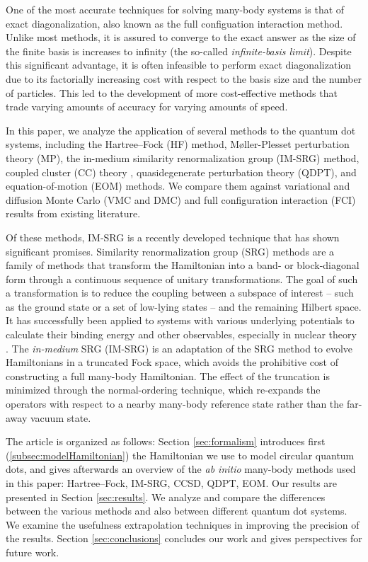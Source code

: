 One of the most accurate techniques for solving many-body systems is that of exact diagonalization, also known as the full configuation interaction method.  Unlike most methods, it is assured to converge to the exact answer as the size of the finite basis is increases to infinity (the so-called \textit{infinite-basis limit}).  Despite this significant advantage, it is often infeasible to perform exact diagonalization due to its factorially increasing cost with respect to the basis size and the number of particles.  This led to the development of more cost-effective methods that trade varying amounts of accuracy for varying amounts of speed.

In this paper, we analyze the application of several methods to the quantum dot systems, including the Hartree--Fock (HF) method, M\o ller-Plesset perturbation theory (MP), the in-medium similarity renormalization group (IM-SRG) method, coupled cluster (CC) theory \cite{PhysRevB.67.045320,heidari:114708,PhysRevB.84.115302}, quasidegenerate perturbation theory (QDPT), and equation-of-motion (EOM) methods.  We compare them against variational and diffusion Monte Carlo (VMC and DMC) \cite{PhysRevB.68.035304,PhysRevB.62.8120,PhysRevB.84.115302,PhysRevB.54.4780} and full configuration interaction (FCI) \cite{olsen2013thesis,JJAP.36.3924,PhysRevB.56.6428,2008arXiv0810.2644K,rontani:124102} results from existing literature.

Of these methods, IM-SRG is a recently developed technique that has shown significant promises.  Similarity renormalization group (SRG) methods are a family of methods that transform the Hamiltonian into a band- or block-diagonal form through a continuous sequence of unitary transformations.  The goal of such a transformation is to reduce the coupling between a subspace of interest -- such as the ground state or a set of low-lying states -- and the remaining Hilbert space.  It has successfully been applied to systems with various underlying potentials to calculate their binding energy and other observables, especially in nuclear theory \cite{ScottSRG,PhysRevC.75.061001,SRGThreeDim}.  The \emph{in-medium} SRG (IM-SRG) is an adaptation of the SRG method to evolve Hamiltonians in a truncated Fock space, which avoids the prohibitive cost of constructing a full many-body Hamiltonian.  The effect of the truncation is minimized through the normal-ordering technique, which re-expands the operators with respect to a nearby many-body reference state rather than the far-away vacuum state.

The article is organized as follows: Section \ref{sec:formalism} introduces first (\ref{subsec:modelHamiltonian}) the Hamiltonian we use to model circular quantum dots, and gives afterwards an overview of the \textit{ab initio} many-body methods used in this paper: Hartree--Fock, IM-SRG, CCSD, QDPT, EOM.  Our results are presented in Section \ref{sec:results}.  We analyze and compare the differences between the various methods and also between different quantum dot systems.  We examine the usefulness extrapolation techniques in improving the precision of the results.  Section \ref{sec:conclusions} concludes our work and gives perspectives for future work.

